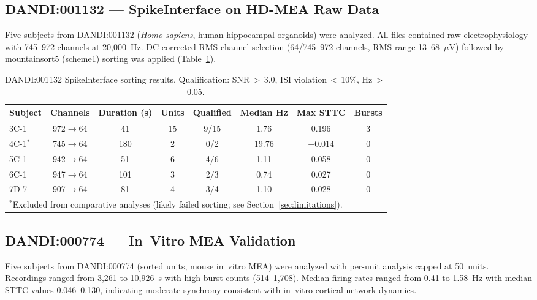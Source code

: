 \documentclass[11pt,a4paper]{article}
\begin{document}
\subsection{DANDI:001132 --- SpikeInterface on HD-MEA Raw Data}

Five subjects from DANDI:001132 (\textit{Homo sapiens}, human hippocampal 
organoids) were analyzed. All files contained raw electrophysiology with 
745--972 channels at 20,000~Hz. DC-corrected RMS channel selection (64/745--972 
channels, RMS range 13--68~$\mu$V) followed by mountainsort5 (scheme1) 
sorting was applied (Table~\ref{tab:001132}).

\begin{table}[h]
\centering
\caption{DANDI:001132 SpikeInterface sorting results. 
Qualification: SNR\,$>$\,3.0, ISI violation\,$<$\,10\%, Hz\,$>$\,0.05.}
\label{tab:001132}
\small
\begin{tabular}{lccccccc}
\toprule
\textbf{Subject} & \textbf{Channels} & \textbf{Duration (s)} & 
\textbf{Units} & \textbf{Qualified} & \textbf{Median Hz} & 
\textbf{Max STTC} & \textbf{Bursts} \\
\midrule
3C-1 & 972$\to$64 & 41 & 15 & 9/15 & 1.76 & 0.196 & 3 \\
4C-1$^{*}$ & 745$\to$64 & 180 & 2 & 0/2 & 19.76 & $-0.014$ & 0 \\
5C-1 & 942$\to$64 & 51 & 6 & 4/6 & 1.11 & 0.058 & 0 \\
6C-1 & 947$\to$64 & 101 & 3 & 2/3 & 0.74 & 0.027 & 0 \\
7D-7 & 907$\to$64 & 81 & 4 & 3/4 & 1.10 & 0.028 & 0 \\
\bottomrule
\multicolumn{8}{l}{\small $^{*}$Excluded from comparative analyses (likely failed sorting; 
see Section~\ref{sec:limitations}).}
\end{tabular}
\end{table}

\subsection{DANDI:000774 --- In~Vitro MEA Validation}

Five subjects from DANDI:000774 (sorted units, mouse in~vitro MEA) were analyzed 
with per-unit analysis capped at 50~units. Recordings ranged from 3,261 to 
10,926~s with high burst counts (514--1,708). Median firing rates ranged from 
0.41 to 1.58~Hz with median STTC values 0.046--0.130, indicating moderate 
synchrony consistent with in~vitro cortical network dynamics.
\end{document}
